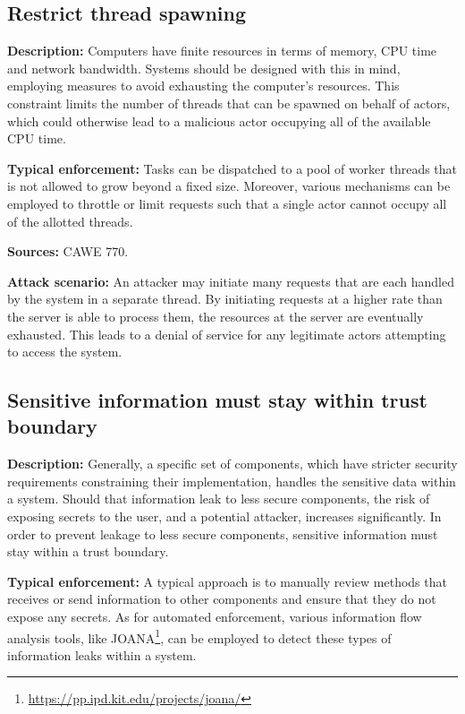 \subsection{Restrict thread spawning}

\textbf{Description:} Computers have finite resources in terms of memory, CPU time and network bandwidth. Systems should be designed with this in mind, employing measures to avoid exhausting the computer's resources. This constraint limits the number of threads that can be spawned on behalf of actors, which could otherwise lead to a malicious actor occupying all of the available CPU time.
 
 \textbf{Typical enforcement:} Tasks can be dispatched to a pool of worker threads that is not allowed to grow beyond a fixed size. Moreover, various mechanisms can be employed to throttle or limit requests such that a single actor cannot occupy all of the allotted threads.
 
 \textbf{Sources:} CAWE 770.
 
 \textbf{Attack scenario:} An attacker may initiate many requests that are each handled by the system in a separate thread. By initiating requests at a higher rate than the server is able to process them, the resources at the server are eventually exhausted. This leads to a denial of service for any legitimate actors attempting to access the system.

\subsection{Sensitive information must stay within trust boundary}\label{sec:trust_boundry_constraint}

\textbf{Description:} 
Generally, a specific set of components, which have stricter security requirements constraining their implementation, handles the sensitive data within a system. Should that information leak to less secure components, the risk of exposing secrets to the user, and a potential attacker, increases significantly. In order to prevent leakage to less secure components, sensitive information must stay within a trust boundary.
 
 \textbf{Typical enforcement:}
 A typical approach is to manually review methods that receives or send information to other components and ensure that they do not expose any secrets. As for automated enforcement, various information flow analysis tools, like JOANA\footnote{\url{https://pp.ipd.kit.edu/projects/joana/}}, can be employed to detect these types of information leaks within a system.
 
